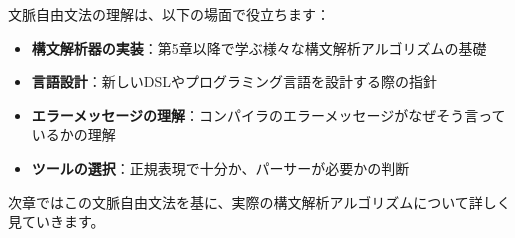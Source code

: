 文脈自由文法の理解は、以下の場面で役立ちます：

\begin{itemize}
\tightlist
\item
  \textbf{構文解析器の実装}：第5章以降で学ぶ様々な構文解析アルゴリズムの基礎
\item
  \textbf{言語設計}：新しいDSLやプログラミング言語を設計する際の指針
\item
  \textbf{エラーメッセージの理解}：コンパイラのエラーメッセージがなぜそう言っているかの理解
\item
  \textbf{ツールの選択}：正規表現で十分か、パーサーが必要かの判断
\end{itemize}

次章ではこの文脈自由文法を基に、実際の構文解析アルゴリズムについて詳しく見ていきます。
